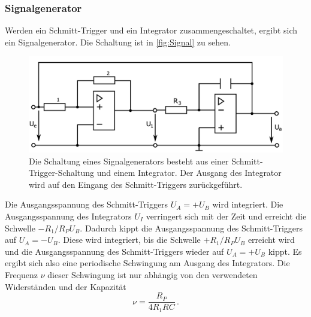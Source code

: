 \subsubsection{Signalgenerator}
Werden ein Schmitt-Trigger und ein Integrator zusammengeschaltet, ergibt sich ein Signalgenerator. Die Schaltung ist in \autoref{fig:Signal} zu sehen.

\begin{figure}
    \centering
    \includegraphics[width=0.7\linewidth]{./figures/5_Signal.png}
    \caption{Die Schaltung eines Signalgenerators besteht aus einer Schmitt-Trigger-Schaltung und einem Integrator. Der Ausgang des Integrator wird auf den Eingang des Schmitt-Triggers zurückgeführt. \cite{Anleitung}} %
    \label{fig:Signal}
\end{figure}

Die Ausgangsspannung des Schmitt-Triggers $U_A = + U_B$ wird integriert. Die Ausgangsspannung des Integrators $U_I$ verringert sich mit der Zeit und erreicht die Schwelle $- R_1/R_P U_B$. Dadurch kippt die Ausgangsspannung des Schmitt-Triggers auf $U_A = - U_B$. Diese wird integriert, bis die Schwelle $+ R_1/R_P U_B$ erreicht wird und die Ausgangsspannung des Schmitt-Triggers wieder auf $U_A = + U_B$ kippt. Es ergibt sich also eine periodische Schwingung am Ausgang des Integrators. Die Frequenz $\nu$ dieser Schwingung ist nur abhängig von den verwendeten Widerständen und der Kapazität
\begin{equation}
    \nu = \frac{R_P}{4 R_1 R C} \, .
    \label{eq:Frequenz}
\end{equation}










